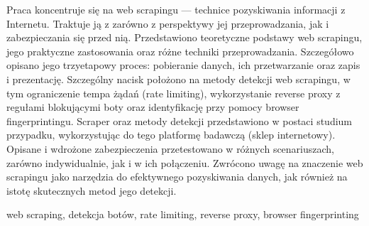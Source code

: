 \streszczenie
Praca koncentruje się na web scrapingu --- technice pozyskiwania informacji z Internetu.
Traktuje ją z zarówno z perspektywy jej przeprowadzania, jak i zabezpieczania się przed nią.
Przedstawiono teoretyczne podstawy web scrapingu, jego praktyczne zastosowania oraz różne techniki przeprowadzania.
Szczegółowo opisano jego trzyetapowy proces: pobieranie danych, ich przetwarzanie oraz zapis i prezentację.
Szczególny nacisk położono na metody detekcji web scrapingu, w tym ograniczenie tempa żądań (rate limiting),
wykorzystanie reverse proxy z regułami blokującymi boty oraz identyfikację przy pomocy browser fingerprintingu.
Scraper oraz metody detekcji przedstawiono w postaci studium przypadku, wykorzystując do tego platformę badawczą (sklep internetowy).
Opisane i wdrożone zabezpieczenia przetestowano w różnych scenariuszach, zarówno indywidualnie, jak i w ich połączeniu.
Zwrócono uwagę na znaczenie web scrapingu jako narzędzia do efektywnego pozyskiwania danych, jak również na istotę skutecznych metod jego detekcji.

\slowakluczowe web scraping, detekcja botów, rate limiting, reverse proxy, browser fingerprinting